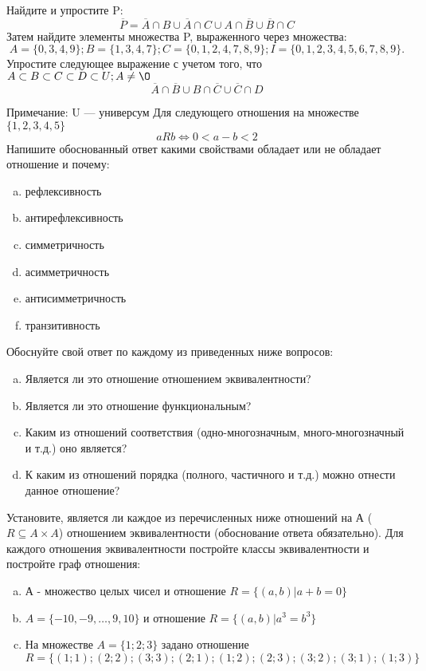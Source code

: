 \documentclass[10pt]{exam}
\begin{document}
\begin{questions}
\question
Найдите и упростите P:
\begin{equation*}
\overline{P} = \overline{A} \cap B \cup \overline{A} \cap C \cup A \cap \overline{B} \cup \overline{B} \cap C
\end{equation*}
Затем найдите элементы множества P, выраженного через множества:
\begin{equation*}
A = \{0, 3, 4, 9\}; 
B = \{1, 3, 4, 7\};
C = \{0, 1, 2, 4, 7, 8, 9\};
I = \{0, 1, 2, 3, 4, 5, 6, 7, 8, 9\}.
\end{equation*}\question
Упростите следующее выражение с учетом того, что $A\subset B \subset C \subset D \subset U; A \neq \O$
\begin{equation*}
\overline{A} \cap \overline{B} \cup B \cap \overline{C} \cup \overline{C} \cap D
\end{equation*}

Примечание: U — универсум\question
Для следующего отношения на множестве $\{1, 2, 3, 4, 5\}$ 
\begin{equation*}
aRb \iff 0 < a-b<2
\end{equation*}
Напишите обоснованный ответ какими свойствами обладает или не обладает отношение и почему:   
\begin{enumerate} [a)]\setcounter{enumi}{0}
\item рефлексивность
\item антирефлексивность
\item симметричность
\item асимметричность
\item антисимметричность
\item транзитивность
\end{enumerate}

Обоснуйте свой ответ по каждому из приведенных ниже вопросов:
\begin{enumerate} [a)]\setcounter{enumi}{0}
    \item Является ли это отношение отношением эквивалентности?
    \item Является ли это отношение функциональным?
    \item Каким из отношений соответствия (одно-многозначным, много-многозначный и т.д.) оно является?
    \item К каким из отношений порядка (полного, частичного и т.д.) можно отнести данное отношение?
\end{enumerate}
\question
Установите, является ли каждое из перечисленных ниже отношений на А ($R \subseteq A \times A$) отношением эквивалентности (обоснование ответа обязательно). Для каждого отношения эквивалентности 
постройте классы эквивалентности и постройте граф отношения:
\begin{enumerate}[a)]\setcounter{enumi}{0}
\item А - множество целых чисел и отношение $R = \{(a,b)|a + b = 0\}$
\item $A = \{-10, -9, …, 9, 10\}$ и отношение $R = \{(a,b)|a^{3} = b^{3}\}$
\item На множестве $A = \{1; 2; 3\}$ задано отношение $R = \{(1; 1); (2; 2); (3; 3); (2; 1); (1; 2); (2; 3); (3; 2); (3; 1); (1; 3)\}$


\end{enumerate}
\end{questions}
\end{document}
